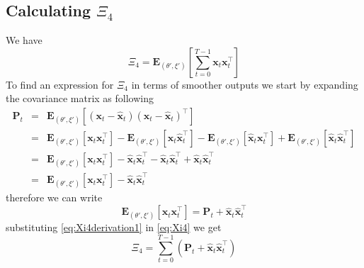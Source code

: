 \documentclass[]{article}
\begin{document}
\subsection*{Calculating $\Xi_4$}
We have
\begin{equation}\label{eq:Xi4}
 \Xi_4=\mathbf E_{(\theta',\xi')}\left[\sum_{t=0}^{T-1}\mathbf x_t\mathbf x_{t}^\top\right]
\end{equation}
To find an expression for $\Xi_4$ in terms of smoother outputs we start by expanding the covariance matrix as following
\begin{eqnarray}
 \mathbf P_{t}&=&\mathbf E_{(\theta',\xi')}\left[(\mathbf x_t-\mathbf{\hat x}_t)(\mathbf x_{t}-\mathbf{\hat x}_{t})^\top\right] \nonumber \\
&=&\mathbf E_{(\theta',\xi')}\left[\mathbf x_t\mathbf x_{t}^\top\right]-\mathbf E_{(\theta',\xi')}\left[\mathbf x_t\mathbf{\hat x}_{t}^\top\right]-\mathbf E_{(\theta',\xi')}\left[\mathbf{\hat x}_t\mathbf x_{t}^\top\right]+\mathbf E_{(\theta',\xi')}\left[\mathbf{\hat x}_t\mathbf{\hat x}_{t}^\top\right] \nonumber \\
&=&\mathbf E_{(\theta',\xi')}\left[\mathbf x_t\mathbf x_{t}^\top\right]-\mathbf {\hat x}_t\mathbf{\hat x}_{t}^\top-\mathbf {\hat x}_t\mathbf{\hat x}_{t}^\top+\mathbf {\hat x}_t\mathbf{\hat x}_{t}^\top \nonumber \\
&=&\mathbf E_{(\theta',\xi')}\left[\mathbf x_t\mathbf x_{t}^\top\right]-\mathbf {\hat x}_t\mathbf{\hat x}_{t}^\top
\end{eqnarray}
therefore we can write
\begin{equation}\label{eq:Xi4derivation1}
 \mathbf E_{(\theta',\xi')}\left[\mathbf x_t\mathbf x_{t}^\top\right]=\mathbf P_{t}+\mathbf {\hat x}_t\mathbf{\hat x}_{t}^\top
\end{equation}
substituting \ref{eq:Xi4derivation1} in \ref{eq:Xi4} we get
\begin{equation}
 \Xi_4=\sum_{t=0}^{T-1}\left(\mathbf P_{t}+\mathbf{\hat x}_t\mathbf{\hat x}_{t}^\top\right)
\end{equation}



\end{document}
